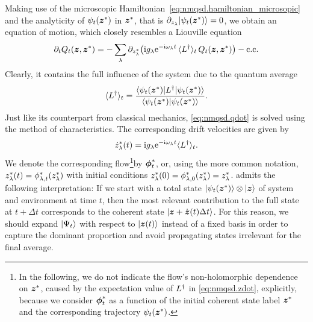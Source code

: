 Making use of the microscopic Hamiltonian~\ref{eq:nmqsd.hamiltonian_microsopic} and the analyticity of $\psitz$ in ${\boldsymbol{z}}^*$, that is $\partial_{z_\lambda} \ket{\psitz} = 0$, we obtain an equation of motion, which closely resembles a Liouville equation
\begin{equation}
  \partial_t Q_t(\zz, \cc\zz) = - \sum_\lambda \partial_{\cc z_\lambda} \big( \ii g_\lambda \exp[-\ii \omega_\lambda t] \, \qmean{\adj L}_t \, Q_t(\zz, \cc\zz) \big) - \mathrm{c.c.}
  \label{eq:nmqsd.qdot}
\end{equation}
Clearly, it contains the full influence of the system due to the quantum average
\begin{equation*}
  \qmean{\adj L}_t = \frac{\bra{\psitz} \adj L \ket{\psitz}}{\braket{\psitz}{\psitz}}.
\end{equation*}
Just like its counterpart from classical mechanics, \autoref{eq:nmqsd.qdot} is solved using the method of characteristics.
The corresponding drift velocities are given by
\begin{equation}
  \cc{\dot z}_\lambda(t) = \ii g_\lambda \exp[-\ii \omega_\lambda t] \qmean{\adj L}_t.
  \label{eq:nmqsd.zdot}
\end{equation}
We denote the corresponding flow\footnote{%
  In the following, we do not indicate the flow's non-holomorphic dependence on ${\boldsymbol{z}}^*$, caused by the expectation value of $L^\dagger$ in \autoref{eq:nmqsd.zdot}, explicitly, because we consider ${\boldsymbol{\phi}}^*_t$ as a function of the initial coherent state label ${\boldsymbol{z}}^*$ and the corresponding trajectory $\psitz$.
}by ${\boldsymbol{\phi}}^*_t$, or, using the more common notation, ${z}^*_\lambda(t) = {\phi}^*_{\lambda,t}({z}^*_\lambda)$ with initial conditions ${z}^*_\lambda(0) = {\phi}^*_{\lambda, 0}({z}^*_\lambda) = {z}^*_\lambda$.
 admits the following interpretation:
If we start with a total state $\ket{\psitz}\otimes\ket{\zz}$ of system and environment at time $t$, then the most relevant contribution to the full state at $t + \Delta t$ corresponds to the coherent state $| \boldsymbol{z} + \dot{\boldsymbol{z}}(t) \Delta t \rangle$.
For this reason, we should expand $| \Psi_t \rangle$ with respect to $| \boldsymbol{z}(t) \rangle$ instead of a fixed basis in order to capture the dominant proportion and avoid propagating states irrelevant for the final average.

